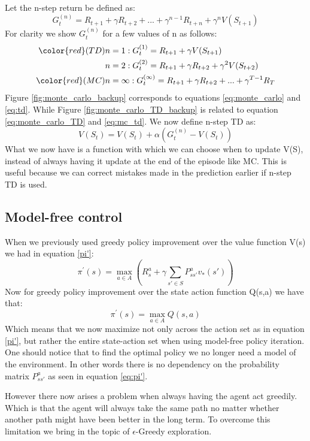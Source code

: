 Let the n-step return be defined as:
\begin{equation}
	G_{t}^{(n)} = R_{t+1} + \gamma R_{t+2} + ... + \gamma^{n-1}R_{t+n} + \gamma^{n}V(S_{t+1})
\end{equation}
For clarity we show 
$G_{t}^{(n)}$ for a few values of n as follows:\\
\begin{align}
	 {\color{red}(TD)} n &= 1: G_{t}^{(1)} = R_{t+1}+\gamma V(S_{t+1}) \label{eq:td} \\
	n &= 2 : G_{t}^{(2)} = R_{t+1}+ \gamma R_{t+2}+\gamma^2 V(S_{t+2}) \\
	{\color{red}(MC)} n &= \infty : G_{t}^{(\infty)} = R_{t+1}+ \gamma R_{t+2}+...+\gamma^{T-1} R_T \label{eq:mc_td}
\end{align}
Figure \ref{fig:monte_carlo_backup} corresponds to equations \ref{eq:monte_carlo} and \ref{eq:td}. While Figure \ref{fig:monte_carlo_TD_backup} is related to equation \ref{eq:monte_carlo_TD} and \ref{eq:mc_td}. We now define n-step TD as:
\begin{equation}
	V(S_t) = V(S_t) + \alpha(G_t^{(n)} - V(S_t))
	\label{eq:n_step_TD}
\end{equation} 
What we now have is a function with which we can choose when to update V(S), instead of always having it update at the end of the episode like MC. This is useful because we can correct mistakes made in the prediction earlier if n-step TD is used.
\subsection{Model-free control}

When we previously used greedy policy improvement over the value function V(s) we had in equation \ref{pi'}:
\[\pi^{'}(s) = \max\limits_{a \in A}(R^{a}_s+\gamma\sum_{s'\in S}P^{a}_{ss'}v_*(s'))\]
Now for greedy policy improvement over the state action function Q(s,a) we have that:
\begin{equation}
	\pi^{'}(s) = \max\limits_{a \in A}Q(s,a)
	\label{eq:pi'}
\end{equation}
Which means that we now maximize not only across the action set as in equation \ref{pi'}, but rather the entire state-action set when using model-free policy iteration. One should notice that to find the optimal policy we no longer need a model of the environment. In other words there is no dependency on the probability matrix $P^{a}_{ss'}$ as seen in equation \ref{eq:pi'}.

However there now arises a problem when always having the agent act greedily. Which is that the agent will always take the same path no matter whether another path might have been better in the long term. To overcome this limitation we bring in the topic of $\epsilon$-Greedy exploration.

